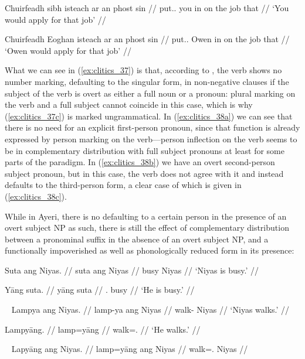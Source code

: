\a\label{ex:clitics_38b}\begingl
	\gla Chuirfeadh sibh isteach ar an phost sin //
	\glb put.\Cond{}.\Tsg{} you in on the job that //
	\glft `You would apply for that job' //
\endgl

\a\label{ex:clitics_38c}\begingl
	\gla Chuirfeadh Eoghan isteach ar an phost sin //
	\glb put.\Cond{}.\Tsg{} Owen in on the job that //
	\glft `Owen would apply for that job' //
\endgl
\xe

What we can see in (\ref{ex:clitics_37}) is that, according to
\citet{spencerluis2012}, the verb shows no number marking, defaulting to the
singular form, in non-negative clauses if the subject of the verb is overt as
either a full noun or a pronoun: plural marking on the verb and a full subject
cannot coincide in this case, which is why (\ref{ex:clitics_37c}) is marked
ungrammatical. In (\ref{ex:clitics_38a}) we can see that there is no need for
an explicit first-person pronoun, since that function is already expressed by
person marking on the verb—person inflection on the verb seems to be in
complementary distribution with full subject pronouns at least for some parts
of the paradigm. In (\ref{ex:clitics_38b}) we have an overt second-person
subject pronoun, but in this case, the verb does not agree with it and instead
defaults to the third-person form, a clear case of which is given in
(\ref{ex:clitics_38c}).

While in Ayeri, there is no defaulting to a certain person in the presence of
an overt subject NP as such, there is still the effect of complementary
distribution between a pronominal suffix in the absence of an overt subject NP,
and a functionally impoverished as well as phonologically reduced form in its
presence:

\pex\label{ex:clitics_39}
\a\label{ex:clitics_39a}\begingl
	\gla Suta ang Niyas. //
	\glb suta ang Niyas //
	\glc busy \Aarg{} Niyas //
	\glft `Niyas is busy.' //
\endgl

\a\label{ex:clitics_39b}\begingl
	\gla Yāng suta. //
	\glb yāng suta //
	\glc \TsgM{}.\Aarg{} busy //
	\glft `He is busy.' //
\endgl
\xe

\pex~\label{ex:clitics_40}
\a\label{ex:clitics_40a}\begingl
	\gla Lampya ang Niyas. //
	\glb lamp-ya ang Niyas //
	\glc walk-\TsgM{} \Aarg{} Niyas //
	\glft `Niyas walks.' //
\endgl

\a\label{ex:clitics_40b}\begingl
	\gla Lampyāng. //
	\glb lamp=yāng //
	\glc walk=\TsgM{}.\Aarg{} //
	\glft `He walks.' //
\endgl
\xe

\pex~\label{ex:clitics_41}
\a\label{ex:clitics_41a}\ljudge{*}\begingl
	\gla Lapyāng ang Niyas. //
	\glb lamp=yāng ang Niyas //
	\glc walk=\TsgM{}.\Aarg{} \Aarg{} Niyas //
\endgl

